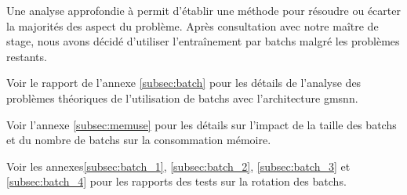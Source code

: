 Une analyse approfondie à permit d'établir une méthode pour résoudre ou écarter la majorités des aspect du problème. Après consultation avec notre maître de stage, nous avons décidé d'utiliser l'entraînement par \glspl{batch} malgré les problèmes restants.

Voir le rapport de l'annexe \ref{subsec:batch} pour les détails de l'analyse des problèmes théoriques de l'utilisation de \glspl{batch} avec l'architecture \gls{gmsnn}.

Voir l'annexe \ref{subsec:memuse} pour les détails sur l'impact de la taille des \glspl{batch} et du nombre de \glspl{batch} sur la consommation mémoire.

Voir les annexes\ref{subsec:batch_1}, \ref{subsec:batch_2}, \ref{subsec:batch_3} et \ref{subsec:batch_4} pour les rapports des tests sur la rotation des \glspl{batch}.